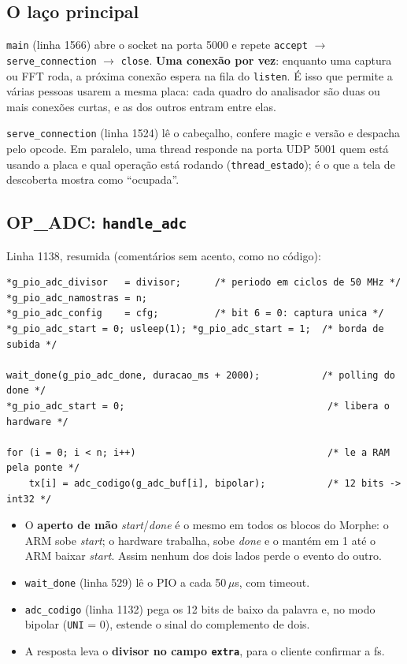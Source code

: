 \documentclass[11pt,a4paper,oneside]{article}
\begin{document}
\subsection{O laço principal}

\texttt{main} (linha 1566) abre o socket na porta 5000 e repete
\texttt{accept} $\to$ \texttt{serve\_connection} $\to$ \texttt{close}.
\textbf{Uma conexão por vez}: enquanto uma captura ou FFT roda, a próxima
conexão espera na fila do \texttt{listen}. É isso que permite a várias pessoas
usarem a mesma placa: cada quadro do analisador são duas ou mais conexões
curtas, e as dos outros entram entre elas.

\texttt{serve\_connection} (linha 1524) lê o cabeçalho, confere magic e versão
e despacha pelo opcode. Em paralelo, uma thread responde na porta UDP 5001 quem
está usando a placa e qual operação está rodando (\texttt{thread\_estado}); é o
que a tela de descoberta mostra como ``ocupada''.

\subsection{OP\_ADC: \texttt{handle\_adc}}

Linha 1138, resumida (comentários sem acento, como no código):

\begin{lstlisting}[style=c]
*g_pio_adc_divisor   = divisor;      /* periodo em ciclos de 50 MHz */
*g_pio_adc_namostras = n;
*g_pio_adc_config    = cfg;          /* bit 6 = 0: captura unica */
*g_pio_adc_start = 0; usleep(1); *g_pio_adc_start = 1;  /* borda de subida */

wait_done(g_pio_adc_done, duracao_ms + 2000);           /* polling do done */
*g_pio_adc_start = 0;                                    /* libera o hardware */

for (i = 0; i < n; i++)                                  /* le a RAM pela ponte */
    tx[i] = adc_codigo(g_adc_buf[i], bipolar);           /* 12 bits -> int32 */
\end{lstlisting}

\begin{itemize}
\item O \textbf{aperto de mão} \emph{start}/\emph{done} é o mesmo em todos os
  blocos do Morphe: o ARM sobe \emph{start}; o hardware trabalha, sobe
  \emph{done} e o mantém em 1 até o ARM baixar \emph{start}. Assim nenhum dos
  dois lados perde o evento do outro.
\item \texttt{wait\_done} (linha 529) lê o PIO a cada 50\,$\mu$s, com timeout.
\item \texttt{adc\_codigo} (linha 1132) pega os 12 bits de baixo da palavra e,
  no modo bipolar (\texttt{UNI} = 0), estende o sinal do complemento de dois.
\item A resposta leva o \textbf{divisor no campo \texttt{extra}}, para o
  cliente confirmar a fs.
\end{itemize}
\end{document}
